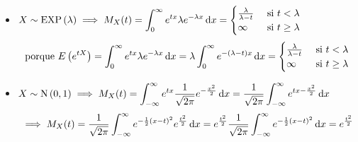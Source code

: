 \begin{ejem}
	\begin{itemize}
		\item $\ds X\sim \EXP{\lambda} \implies M_X(t) = \int_{0}^{\infty} e^{tx}\lambda e^{-\lambda x}\odif{x} = \begin{cases}
				      \frac{\lambda}{\lambda - t} & \tex{ si } t < \lambda    \\
				      \infty                      & \tex{ si } t \geq \lambda
			      \end{cases}$
		      \[\tex{porque } E\left(e^{tX}\right) = \int_{0}^{\infty} e^{tx}\lambda e^{-\lambda x}\odif{x} = \lambda \int_{0}^{\infty} e^{-(\lambda - t)x}\odif{x} = \begin{cases}
				      \frac{\lambda}{\lambda - t} & \tex{ si } t < \lambda    \\
				      \infty                      & \tex{ si } t \geq \lambda
			      \end{cases}\]
		\item $\ds X\sim \normal{0,1} \implies M_X(t) = \int_{-\infty}^{\infty} e^{tx}\frac{1}{\sqrt{2\pi}}e^{-\frac{x^2}{2}}\odif{x} = \frac{1}{\sqrt{2\pi}}\int_{-\infty}^{\infty} e^{tx-\frac{x^2}{2}}\odif{x}$
		      \[\implies M_X(t) = \frac{1}{\sqrt{2\pi}} \int_{-\infty}^{\infty} e^{-\frac{1}{2}\left(x-t\right)^2} e^{\frac{t^2}{2}}\odif{x} = e^{\frac{t^2}{2}} \frac{1}{\sqrt{2\pi}} \int_{-\infty}^{\infty} e^{-\frac{1}{2}\left(x-t\right)^2}\odif{x} = e^{\frac{t^2}{2}}\]
	\end{itemize}
\end{ejem}